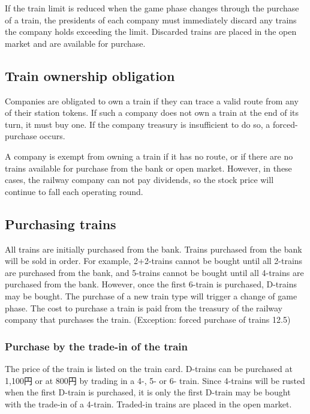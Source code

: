 \documentclass{article}
\begin{document}
\begin{CJK}{UTF8}{min}
\begin{multicols}{2}
If the train limit is reduced when the game phase changes through the
purchase of a train, the presidents of each company must immediately
discard any trains the company holds exceeding the limit. Discarded
trains are placed in the open market and are available for purchase.

\subsection{Train ownership obligation}
\label{train-obligation}
Companies are obligated to own a train if they can trace a valid route
from any of their station tokens. If such a company does not own a train at
the end of its turn, it must buy one. If the company treasury is
insufficient to do so, a forced-purchase occurs.

A company is exempt from owning a train if it has no route, or if
there are no trains available for purchase from the bank or open
market. However, in these cases, the railway company can not pay
dividends, so the stock price will continue to fall each operating
round.

\subsection{Purchasing trains} \label{sec:buying-trains}

All trains are initially purchased from the bank. Trains purchased
from the bank will be sold in order. For example, 2+2-trains cannot be
bought until all 2-trains are purchased from the bank, and 5-trains
cannot be bought until all 4-trains are purchased from the
bank. However, once the first 6-train is purchased, D-trains may be
bought. The purchase of a new train type will trigger a change of game
phase. The cost to purchase a train is paid from the treasury of the
railway company that purchases the train. (Exception: forced purchase
of trains 12.5)

\subsubsection{Purchase by the trade-in of the train}

The price of the train is listed on the train card. D-trains can be
purchased at 1,100円 or at 800円 by trading in a 4-, 5- or 6-
train. Since 4-trains will be rusted when the first D-train is
purchased, it is only the first D-train may be bought with the
trade-in of a 4-train. Traded-in trains are placed in the open market.


\end{multicols}
\end{CJK}
\end{document}
